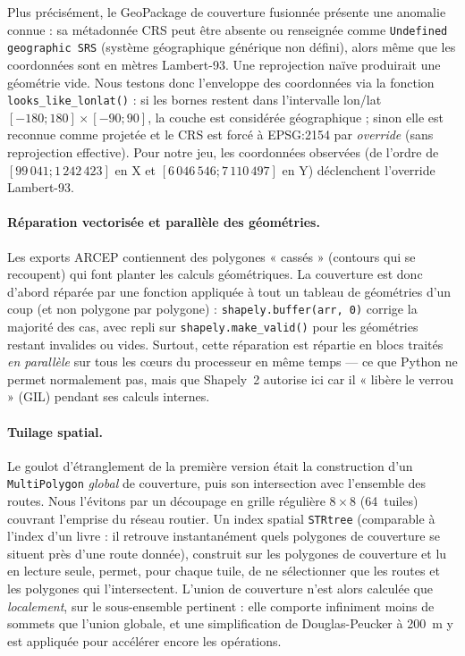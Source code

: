 \documentclass[11pt,a4paper]{article}
\begin{document}
Plus précisément, le GeoPackage de couverture fusionnée présente une anomalie connue : sa métadonnée CRS peut être absente ou renseignée comme \texttt{Undefined geographic SRS} (système géographique générique non défini), alors même que les coordonnées sont en mètres Lambert-93. Une reprojection naïve produirait une géométrie vide. Nous testons donc l'enveloppe des coordonnées via la fonction \texttt{looks\_like\_lonlat()} : si les bornes restent dans l'intervalle lon/lat $[-180;180]\times[-90;90]$, la couche est considérée géographique ; sinon elle est reconnue comme projetée et le CRS est forcé à EPSG:2154 par \emph{override} (sans reprojection effective). Pour notre jeu, les coordonnées observées (de l'ordre de $[99\,041 ; 1\,242\,423]$ en X et $[6\,046\,546 ; 7\,110\,497]$ en Y) déclenchent l'override Lambert-93.

\paragraph{Réparation vectorisée et parallèle des géométries.}
Les exports ARCEP contiennent des polygones « cassés » (contours qui se recoupent) qui font planter les calculs géométriques. La couverture est donc d'abord réparée par une fonction appliquée à tout un tableau de géométries d'un coup (et non polygone par polygone) : \texttt{shapely.buffer(arr, 0)} corrige la majorité des cas, avec repli sur \texttt{shapely.make\_valid()} pour les géométries restant invalides ou vides. Surtout, cette réparation est répartie en blocs traités \emph{en parallèle} sur tous les cœurs du processeur en même temps — ce que Python ne permet normalement pas, mais que Shapely~2 autorise ici car il « libère le verrou » (GIL) pendant ses calculs internes.

\paragraph{Tuilage spatial.}
Le goulot d'étranglement de la première version était la construction d'un \texttt{MultiPolygon} \emph{global} de couverture, puis son intersection avec l'ensemble des routes. Nous l'évitons par un découpage en grille régulière $8\times8$ (64~tuiles) couvrant l'emprise du réseau routier. Un index spatial \texttt{STRtree} (comparable à l'index d'un livre : il retrouve instantanément quels polygones de couverture se situent près d'une route donnée), construit sur les polygones de couverture et lu en lecture seule, permet, pour chaque tuile, de ne sélectionner que les routes et les polygones qui l'intersectent. L'union de couverture n'est alors calculée que \emph{localement}, sur le sous-ensemble pertinent : elle comporte infiniment moins de sommets que l'union globale, et une simplification de Douglas-Peucker à 200~m y est appliquée pour accélérer encore les opérations.
\end{document}
